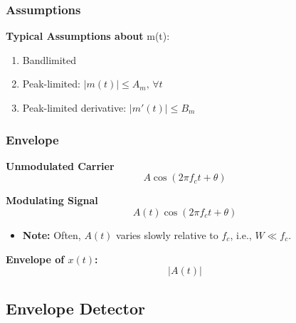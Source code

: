 \subsubsection{Assumptions}
\begin{definition}
    \textbf{Typical Assumptions about } m(t):
    \begin{enumerate}
        \item Bandlimited
        \item Peak-limited: $|m(t)| \leq A_m, \, \forall t$
        \item Peak-limited derivative: $|m'(t)| \leq B_m$
    \end{enumerate}
\end{definition}

\subsubsection{Envelope}
\begin{definition}
    \textbf{Unmodulated Carrier}
    \[
    A \cos(2 \pi f_c t + \theta)
    \]
    \vspace{1em}

    \textbf{Modulating Signal}
    \[
    A(t) \cos(2 \pi f_c t + \theta)
    \]
    \begin{itemize}
        \item \textbf{Note:} Often, \( A(t) \) varies slowly relative to \( f_c \), i.e., \( W \ll f_c \).
    \end{itemize}
    \vspace{1em}

    \textbf{Envelope of $x(t)$:}
    \[
    |A(t)|
    \]
\end{definition}

\subsection{Envelope Detector}
\begin{intuition}
\end{intuition}
